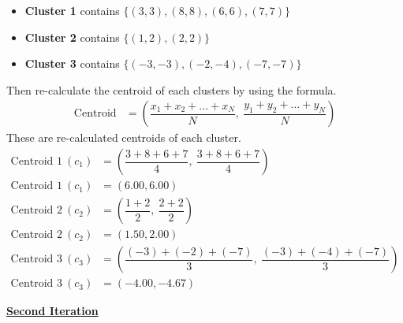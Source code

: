 \documentclass[12pt, a4paper]{article}
\begin{document}
\begin{enumerate}
            \begin{itemize}
                \item \textbf{Cluster 1} contains $\lbrace(3, 3), (8, 8), (6, 6), (7, 7)\rbrace$
                \item \textbf{Cluster 2} contains $\lbrace(1, 2), (2, 2)\rbrace$
                \item \textbf{Cluster 3} contains $\lbrace(-3, -3), (-2, -4), (-7, -7)\rbrace$
            \end{itemize}

            Then re-calculate the centroid of each clusters by using the formula.
            \begin{align*}
                \text{Centroid} & = \left( \dfrac{x_{1} + x_{2} + ... + x_{N}}{N}, \ \dfrac{y_{1} + y_{2} + ... + y_{N}}{N} \right)
            \end{align*}
            These are re-calculated centroids of each cluster.
            \begin{align*}
                \text{Centroid 1}\ (c_{1}) & = \left( \dfrac{3 + 8 + 6 + 7}{4},\ \dfrac{3 + 8 + 6 + 7}{4} \right) \\
                \text{Centroid 1}\ (c_{1}) & = (6.00, 6.00) \\[0.75em]
                \text{Centroid 2}\ (c_{2}) & = \left( \dfrac{1 + 2}{2},\ \dfrac{2 + 2}{2} \right) \\
                \text{Centroid 2}\ (c_{2}) & = (1.50, 2.00) \\[0.75em]
                \text{Centroid 3}\ (c_{3}) & = \left( \dfrac{(-3) + (-2) + (-7)}{3},\ \dfrac{(-3) + (-4) + (-7)}{3} \right) \\
                \text{Centroid 3}\ (c_{3}) & = (-4.00, -4.67)
            \end{align*}
        \pagebreak

            \underline{\textbf{Second Iteration}}


\end{enumerate}
\end{document}
